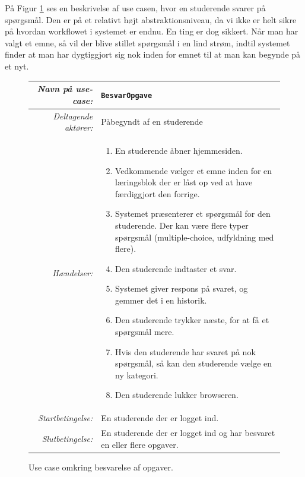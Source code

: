 \documentclass[11pt, a4paper]{article}
\begin{document}
På Figur \ref{fig:use_case2} ses en beskrivelse af use casen, hvor en studerende svarer på spørgsmål. Den er på et relativt højt abstraktionsniveau, da vi ikke er helt sikre på hvordan workflowet i systemet er endnu. En ting er dog sikkert. Når man har valgt et emne, så vil der blive stillet spørgsmål i en lind strøm, indtil systemet finder at man har dygtiggjort sig nok inden for emnet til at man kan begynde på et nyt.
\begin{figure}[h!]
    \centering
    \begin{tabular}{r p{8cm}}
        \toprule
        \textit{Navn på use-case:} & \verb!BesvarOpgave! \\
        \hline
        \textit{Deltagende aktører:} & Påbegyndt af en studerende \\
        \hline
        \textit{Hændelser:} & \begin{enumerate}[nolistsep]
            \item En studerende åbner hjemmesiden.
            \item Vedkommende vælger et emne inden for en læringsblok der er låst op ved at have færdiggjort den forrige.
            \item Systemet præsenterer et spørgsmål for den studerende. Der kan være flere typer spørgsmål (multiple-choice, udfyldning med flere).
            \item Den studerende indtaster et svar.
            \item Systemet giver respons på svaret, og gemmer det i en historik.
            \item Den studerende trykker næste, for at få et spørgsmål mere.
            \item Hvis den studerende har svaret på nok spørgsmål, så kan den studerende vælge en ny kategori.
            \item Den studerende lukker browseren.
        \end{enumerate}  \\
        \hline
        \textit{Startbetingelse:} & En studerende der er logget ind. \\
        \hline
        \textit{Slutbetingelse:} & En studerende der er logget ind og har besvaret en eller flere opgaver. \\
        \bottomrule
    \end{tabular}
    \caption{Use case omkring besvarelse af opgaver.}
    \label{fig:use_case2}
\end{figure}
\end{document}
